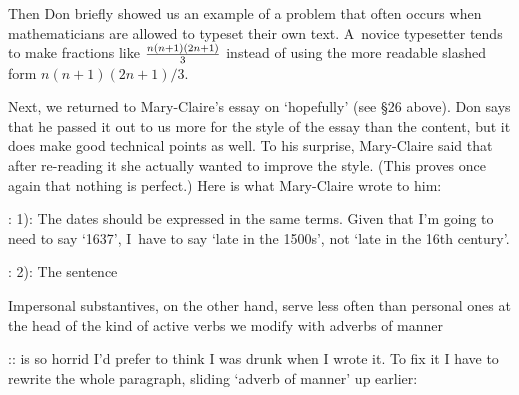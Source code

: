 


Then Don briefly showed us an example of a problem that often
occurs when mathematicians are allowed to typeset their own text.
A~novice typesetter tends to make fractions like 
${n(n+1)(2n+1)\over 3}$ instead of using the more readable
slashed form $n(n+1)(2n+1)/3$.

Next, we returned to Mary-Claire's essay on `hopefully' (see \S{26}
above).  Don says that he passed it out to us more for the style
of the essay than the content, but it does make good technical points
as well.  To
his surprise, Mary-Claire said that after re-reading it she actually
wanted to improve the style. (This proves once again that nothing is
perfect.) Here is what Mary-Claire wrote to him:

\display 30pt:
1): The dates should be expressed in the same terms.  Given that I'm
    going to need to say `1637', I~have to say `late in the 1500s',
    not `late in the 16th century'.

\display 30pt:
2): The sentence

{\narrower\narrower\smallskip\noindent
        Impersonal substantives, on the other hand, serve less often
        than personal ones at the head of the kind of active verbs
        we modify with adverbs of manner
\smallskip}

\display 30pt::
    is so horrid I'd prefer to think I was drunk when I wrote it.
    To fix it I have to rewrite the whole paragraph, sliding `adverb
    of manner' up earlier:
   
